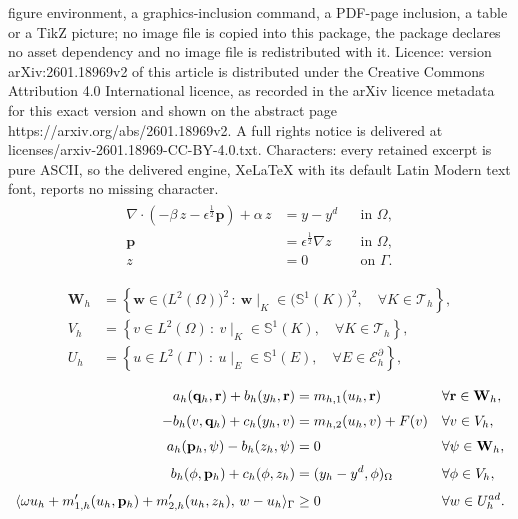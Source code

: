 \documentclass[10pt,a4paper]{amsart}
\newcommand{\Uadh}{{U^{\textup{ad}}_h}}
\newcommand{\bW}{{\mathbf{W}}}
\newcommand{\bp}{{\mathbf{p}}}
\newcommand{\bq}{{\mathbf{q}}}
\newcommand{\br}{{\mathbf{r}}}
\newcommand{\cE}{{\mathcal{E}}}
\newcommand{\cT}{{\mathcal{T}}}
\newcommand{\hF}{{\frac{1}{2}}}
\newcommand{\set}[2]{\left\{{#1}\,:~{#2}\right\}}
\begin{document}
figure environment, a graphics-inclusion command, a PDF-page inclusion, a table or a TikZ picture; no image file is copied into this package, the package declares no asset dependency and no image file is redistributed with it. Licence: version arXiv:2601.18969v2 of this article is distributed under the Creative Commons Attribution 4.0 International licence, as recorded in the arXiv licence metadata for this exact version and shown on the abstract page https://arxiv.org/abs/2601.18969v2. A full rights notice is delivered at licenses/arxiv-2601.18969-CC-BY-4.0.txt. Characters: every retained excerpt is pure ASCII, so the delivered engine, XeLaTeX with its default Latin Modern text font, reports no missing character.
\begin{align}\label{p13b}
\begin{aligned}
\nabla \cdot (-\beta\, z - \epsilon^{\hF} \mathbf{p}) + \alpha\, z &= y - y^{d}
    &&\text{in }\Omega,\\[2mm]
\mathbf{p} &= \epsilon^{\hF} \nabla z
    &&\text{in }\Omega,\\[2mm]
z &= 0
    &&\text{on }\Gamma .
\end{aligned}
\end{align}

\begin{subequations}\label{DG1}
\begin{align}
    \mathbf{W}_h &= \set{\mathbf w \in \big(L^2(\Omega)\big)^2}{ \mathbf w\mid_{K}\in \big( \mathbb{S}^1(K) \big)^2, \quad \forall K \in \cT_h}, \\[4pt]
    V_h &= \set{v \in L^2(\Omega)}{ v \mid_{K}\in \mathbb{S}^1(K), \quad \forall K \in \cT_h}, \\[4pt]
    U_h &= \set{u \in L^2(\Gamma)}{ u \mid_{E}\in \mathbb{S}^1(E), \quad \forall E \in \cE_h^{\partial}},
\end{align}
\end{subequations}

\begin{align}
a_h(\bq_h, \br) + b_h(y_h, \br) 
&= m_{h,1}(u_h, \br)
&& \forall \br \in \bW_h, \label{DG8a} \\[0.3em] 
-b_h(v, \bq_h) + c_h(y_h, v) 
&= m_{h,2}(u_h, v) + F(v)
&& \forall v \in V_h, \label{DG8b} \\[0.3em] 
a_h(\bp_h, \psi) - b_h(z_h, \psi) 
&= 0 
&& \forall \psi \in \bW_h, \label{DG8c} \\[0.3em] 
b_h(\phi, \bp_h) + c_h(\phi, z_h) 
&= (y_h - y^d, \phi)_\Omega
&& \forall \phi \in V_h, \label{DG8d} \\[0.3em] 
\langle \omega u_h + m'_{1,h}(u_h, \bp_h) + m'_{2,h}(u_h, z_h), \, w - u_h \rangle_\Gamma 
&\ge 0
&& \forall w \in \Uadh. \label{DG8e}
\end{align}
\end{document}
